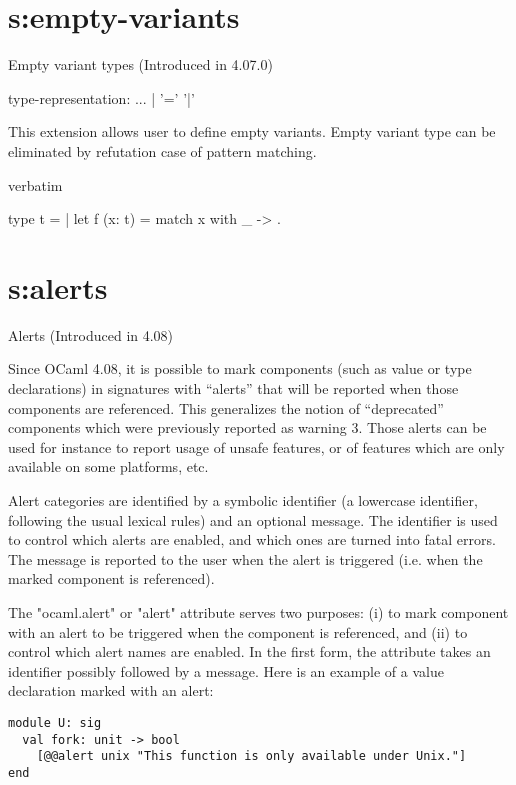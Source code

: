 {\section{s:empty-variants}{Empty variant types}
(Introduced in 4.07.0)

\begin{syntax}
type-representation:
          ...
        | '=' '|'
\end{syntax}
This extension allows user to define empty variants.
Empty variant type can be eliminated by refutation case of pattern matching.
\begin{camlexample}{verbatim}
\begin{caml}
\begin{camlinput}
type t = |
let f (x: t) = match x with _ -> .
\end{camlinput}
\end{caml}
\end{camlexample}

\section{s:alerts}{Alerts}
(Introduced in 4.08)

Since OCaml 4.08, it is possible to mark components (such as value or
type declarations) in signatures with ``alerts'' that will be reported
when those components are referenced.  This generalizes the notion of
``deprecated'' components which were previously reported as warning 3.
Those alerts can be used for instance to report usage of unsafe
features, or of features which are only available on some platforms,
etc.

Alert categories are identified by a symbolic identifier (a lowercase
identifier, following the usual lexical rules) and an optional
message.  The identifier is used to control which alerts are enabled,
and which ones are turned into fatal errors.  The message is reported
to the user when the alert is triggered (i.e. when the marked
component is referenced).

The "ocaml.alert" or "alert" attribute serves two purposes: (i) to
mark component with an alert to be triggered when the component is
referenced, and (ii) to control which alert names are enabled.  In the
first form, the attribute takes an identifier possibly
followed by a message. Here is an example of a value declaration marked
with an alert:

\begin{verbatim}
module U: sig
  val fork: unit -> bool
    [@@alert unix "This function is only available under Unix."]
end
\end{verbatim}

}
